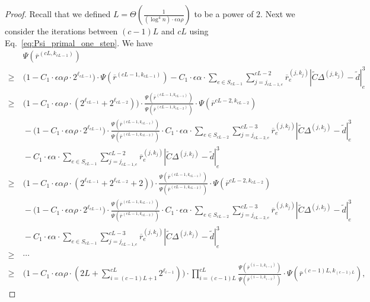 \documentclass[11pt]{article}
\newcommand\dd{\boldsymbol{\mathit{d}}}
\newcommand\rr{\boldsymbol{\mathit{r}}}
\newcommand\CC{\boldsymbol{\mathit{C}}}
\newcommand{\wt}{\widetilde}
\newcommand{\ov}{\overline}
\begin{document}
\begin{proof}
Recall that we defined $L = \Theta(\frac{1}{(\log^4 n) \cdot \epsilon \alpha \rho})$ to be a power of $2$. Next we consider the iterations between $(c-1) L$ and $cL$ using Eq.~\eqref{eq:Psi_primal_one_step}. We have
\begin{align*}
&~ \Psi(\ov{\rr}^{(cL, k_{cL-1})}) \\
\geq &~ \Big(1 -  C_1 \cdot \epsilon \alpha \rho \cdot 2^{\ell_{cL-1}}\Big) \cdot \Psi(\ov{\rr}^{(cL-1, k_{cL-1})}) - C_1 \cdot \epsilon \alpha \cdot \sum_{e \in S_{cL-1}} \sum_{j=j_{cL-1,e}}^{cL-2} \ov{\rr}^{(j,k_j)}_e |\wt{\CC}\Delta^{(j,k_j)}-\wt{\dd}|_e^3 \\
\geq &~ \Big(1 -  C_1 \cdot \epsilon \alpha \rho \cdot (2^{\ell_{cL-1}} + 2^{\ell_{cL-2}}) \Big) \cdot \frac{\Psi(\ov{\rr}^{(cL-1, k_{cL-1})})}{\Psi(\ov{\rr}^{(cL-1, k_{cL-2})})} \cdot \Psi(\ov{\rr}^{cL-2, k_{cL-2}}) \\
&~ - \Big(1 -  C_1 \cdot \epsilon \alpha \rho \cdot 2^{\ell_{cL-1}}\Big) \cdot \frac{\Psi(\ov{\rr}^{(cL-1, k_{cL-1})})}{\Psi(\ov{\rr}^{(cL-1, k_{cL-2})})} \cdot C_1 \cdot \epsilon \alpha \cdot \sum_{e \in S_{cL-2}} \sum_{j=j_{cL-2,e}}^{cL-3} \ov{\rr}^{(j,k_j)}_e |\wt{\CC}\Delta^{(j,k_j)}-\wt{\dd}|_e^3  \\
&~ - C_1 \cdot \epsilon \alpha \cdot \sum_{e \in S_{cL-1}} \sum_{j=j_{cL-1,e}}^{cL-2} \ov{\rr}^{(j,k_j)}_e |\wt{\CC}\Delta^{(j,k_j)}-\wt{\dd}|_e^3 \\
\geq &~ \Big(1 -  C_1 \cdot \epsilon \alpha \rho \cdot (2^{\ell_{cL-1}} + 2^{\ell_{cL-2}} + 2) \Big) \cdot \frac{\Psi(\ov{\rr}^{(cL-1, k_{cL-1})})}{\Psi(\ov{\rr}^{(cL-1, k_{cL-2})})} \cdot \Psi(\ov{\rr}^{cL-2, k_{cL-2}}) \\
&~ - \Big(1 -  C_1 \cdot \epsilon \alpha \rho \cdot 2^{\ell_{cL-1}}\Big) \cdot \frac{\Psi(\ov{\rr}^{(cL-1, k_{cL-1})})}{\Psi(\ov{\rr}^{(cL-1, k_{cL-2})})} \cdot C_1 \cdot \epsilon \alpha \cdot \sum_{e \in S_{cL-2}} \sum_{j=j_{cL-2,e}}^{cL-3} \ov{\rr}^{(j,k_j)}_e |\wt{\CC}\Delta^{(j,k_j)}-\wt{\dd}|_e^3  \\
&~ - C_1 \cdot \epsilon \alpha \cdot \sum_{e \in S_{cL-1}} \sum_{j=j_{cL-1,e}}^{cL-3} \ov{\rr}^{(j,k_j)}_e |\wt{\CC}\Delta^{(j,k_j)}-\wt{\dd}|_e^3 \\
\geq &~ \cdots \\
\geq &~ \Big(1 -  C_1 \cdot \epsilon \alpha \rho \cdot (2L + \sum_{i=(c-1)L+1}^{cL} 2^{\ell_{i-1}}) \Big) \cdot \prod_{i=(c-1)L}^{cL} \frac{\Psi(\ov{\rr}^{(i-1, k_{i-1})})}{\Psi(\ov{\rr}^{(i-1, k_{i-2})})} \cdot \Psi(\ov{\rr}^{(c-1)L, k_{(c-1)L}}),
\end{align*}

\end{proof}
\end{document}
